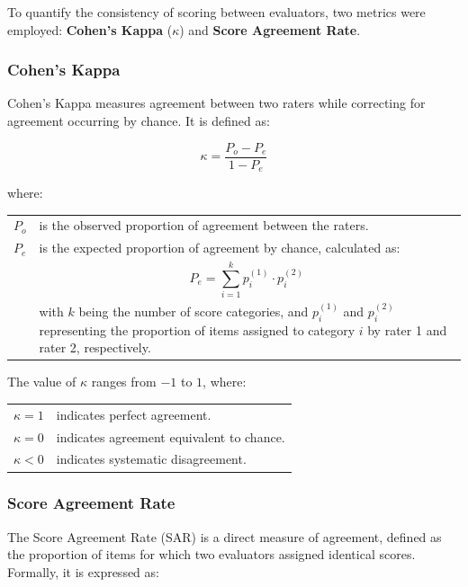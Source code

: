 To quantify the consistency of scoring between evaluators, two 
metrics were employed: \textbf{Cohen's Kappa} ($\kappa$) and 
\textbf{Score Agreement Rate}.

\subsubsection{Cohen's Kappa}

Cohen's Kappa measures agreement between two raters while 
correcting for agreement occurring by chance. It is defined as:

\begin{equation}
    \kappa = \frac{P_o - P_e}{1 - P_e}
\end{equation}

where:  

\begin{longtable}{l p{}}
    $P_o$ & is the observed proportion of agreement between the raters. \\
    $P_e$ & is the expected proportion of agreement by chance, calculated as: \\
    {} & \vspace{-1.5em}\begin{equation}
      P_e = \sum_{i=1}^{k} p_{i}^{(1)} \cdot p_{i}^{(2)}
    \end{equation}\vspace{-1.5em} \\ 
    {} & with $k$ being the number of score categories, and $p_i^{(1)}$ and $p_i^{(2)}$ representing the proportion of items assigned to category $i$ by rater 1 and rater 2, respectively. \\
\end{longtable}

The value of $\kappa$ ranges from $-1$ to $1$, where:  

\begin{tabular}{l l}
    $\kappa = 1$ & indicates perfect agreement. \\
    $\kappa = 0$ & indicates agreement equivalent to chance. \\
    $\kappa < 0$ & indicates systematic disagreement. \\
\end{tabular}

\subsubsection{Score Agreement Rate}

The Score Agreement Rate (SAR) is a direct measure of agreement, 
defined as the proportion of items for which two evaluators 
assigned identical scores. Formally, it is expressed as:

